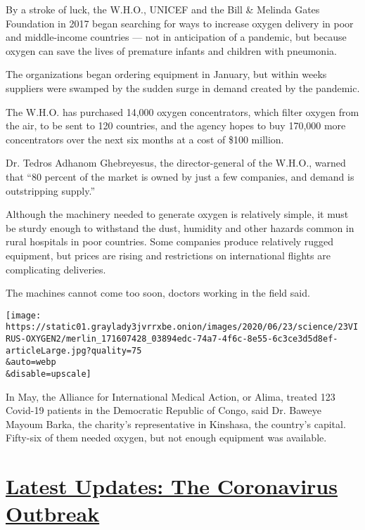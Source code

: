 By a stroke of luck, the W.H.O., UNICEF and the Bill \& Melinda Gates
Foundation in 2017 began searching for ways to increase oxygen delivery
in poor and middle-income countries --- not in anticipation of a
pandemic, but because oxygen can save the lives of premature infants and
children with pneumonia.

The organizations began ordering equipment in January, but within weeks
suppliers were swamped by the sudden surge in demand created by the
pandemic.

The W.H.O. has purchased 14,000 oxygen concentrators, which filter
oxygen from the air, to be sent to 120 countries, and the agency hopes
to buy 170,000 more concentrators over the next six months at a cost of
\$100 million.

Dr. Tedros Adhanom Ghebreyesus, the director-general of the W.H.O.,
warned that ``80 percent of the market is owned by just a few companies,
and demand is outstripping supply.''

Although the machinery needed to generate oxygen is relatively simple,
it must be sturdy enough to withstand the dust, humidity and other
hazards common in rural hospitals in poor countries. Some companies
produce relatively rugged equipment, but prices are rising and
restrictions on international flights are complicating deliveries.

The machines cannot come too soon, doctors working in the field said.

\texttt{[image: https://static01.graylady3jvrrxbe.onion/images/2020/06/23/science/23VIRUS-OXYGEN2/merlin\_171607428\_03894edc-74a7-4f6c-8e55-6c3ce3d5d8ef-articleLarge.jpg?quality=75\\\&auto=webp\\\&disable=upscale]}

In May, the Alliance for International Medical Action, or Alima, treated
123 Covid-19 patients in the Democratic Republic of Congo, said Dr.
Baweye Mayoum Barka, the charity's representative in Kinshasa, the
country's capital. Fifty-six of them needed oxygen, but not enough
equipment was available.

\hypertarget{latest-updates-the-coronavirus-outbreak}{%
\section{\texorpdfstring{\href{https://www.nytimes3xbfgragh.onion/2020/09/08/world/covid-19-coronavirus.html?action=click\&pgtype=Article\&state=default\&region=MAIN_CONTENT_1\&context=storylines_live_updates}{Latest
Updates: The Coronavirus
Outbreak}}{Latest Updates: The Coronavirus Outbreak}}\label{latest-updates-the-coronavirus-outbreak}}

